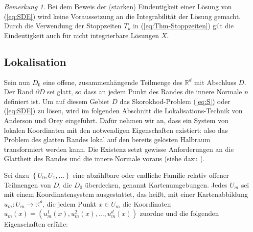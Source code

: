 \documentclass[10pt, a4paper, leqno, twoside, bibliography=totocnumbered, final]{scrartcl}
\theoremstyle{definition}
\theoremstyle{plain}%
\theoremstyle{remark}
\newtheorem*{bem}{Bemerkung}
\begin{document}
\begin{bem}
Bei dem Beweis der (starken) Eindeutigkeit einer Lösung von (\ref{eq:SDE}) wird keine Voraussetzung an die Integrabilität der Lösung gemacht. Durch die Verwendung der Stoppzeiten $ T_k $ in (\ref{eq:Thm-Stoppzeiten}) gilt die Eindeutigkeit auch für nicht integrierbare Lösungen $ X $.
\end{bem}


\subsection{Lokalisation}
\label{sec:lokalisation}

Sein nun $ D_0 $ eine offene, zusammenhängende Teilmenge des $ \mathbb{R}^d $ mit Abschluss $ D $. Der Rand $ \partial D $ sei glatt, so dass an jedem Punkt des Randes die innere Normale $ n $ definiert ist. Um auf diesem Gebiet $ D $ das Skorokhod-Problem (\ref{eq:S}) oder (\ref{eq:SDE}) zu lösen, wird im folgenden Abschnitt die Lokalisations-Technik von Anderson und Orey eingeführt. Dafür nehmen wir an, dass ein System von lokalen Koordinaten mit den notwendigen Eigenschaften existiert; also das Problem des glatten Randes lokal auf den bereits gelösten Halbraum transformiert werden kann. Die Existenz setzt gewisse Anforderungen an die Glattheit des Randes und die innere Normale voraus (siehe dazu \cite{Anderson-Orey}). 

Sei dazu $ \left\lbrace U_0, U_1, \dots \right\rbrace $ eine abzählbare oder endliche Familie relativ offener Teilmengen von $ D $, die $ D_0 $ überdecken, genannt Kartenumgebungen. Jedes $ U_m $ sei mit einem Koordinatensystem ausgestattet, das heißt, mit einer Kartenabbildung $ u_m: U_m \to \mathbb{R}^d $, die jedem Punkt $ x \in U_m $ die Koordinaten $ u_m(x) = (u_m^1(x), u_m^2(x), \dots , u_m^d(x) ) $ zuordne und die folgenden Eigenschaften erfülle:
\end{document}
